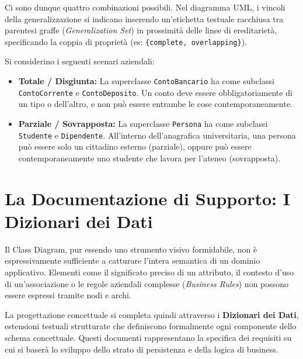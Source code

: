 \medskip

Ci sono dunque quattro combinazioni possibili. Nel diagramma UML, i vincoli della generalizzazione si indicano inserendo un'etichetta testuale racchiusa tra parentesi graffe (\textit{Generalization Set}) in prossimità delle linee di ereditarietà, specificando la coppia di proprietà (es: \texttt{\{complete, overlapping\}}).

\begin{example}
Si considerino i seguenti scenari aziendali:
\begin{itemize}
    \item \textbf{Totale / Disgiunta:} La superclasse \texttt{ContoBancario} ha come subclassi \\ \texttt{ContoCorrente} e \texttt{ContoDeposito}. Un conto deve essere obbligatoriamente di un tipo o dell'altro, e non può essere entrambe le cose contemporaneamente.
    \item \textbf{Parziale / Sovrapposta:} La superclasse \texttt{Persona} ha come subclassi \texttt{Studente} e \texttt{Dipendente}. All'interno dell'anagrafica universitaria, una persona può essere solo un cittadino esterno (parziale), oppure può essere contemporaneamente uno studente che lavora per l'ateneo (sovrapposta).
\end{itemize}
\end{example}

\section{La Documentazione di Supporto: I Dizionari dei Dati}

Il Class Diagram, pur essendo uno strumento visivo formidabile, non è espressivamente sufficiente a catturare l'intera semantica di un dominio applicativo. Elementi come il significato preciso di un attributo, il contesto d'uso di un'associazione o le regole aziendali complesse (\textit{Business Rules}) non possono essere espressi tramite nodi e archi. 

La progettazione concettuale si completa quindi attraverso i \textbf{Dizionari dei Dati}, estensioni testuali strutturate che definiscono formalmente ogni componente dello schema concettuale. Questi documenti rappresentano la specifica dei requisiti su cui si baserà lo sviluppo dello strato di persistenza e della logica di business.

\medskip

